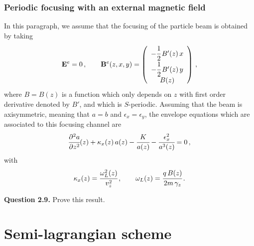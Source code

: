 \documentclass[10pt]{article}
\newcommand{\D}{{\partial}}
\begin{document}
\subsubsection{Periodic focusing with an external magnetic field}

In this paragraph, we assume that the focusing of the particle beam is obtained by taking
\begin{equation} \label{periodic_magnetic}
\mathbf{E}^{e} = 0 \, , \qquad \mathbf{B}^{e}(z,x,y) = \left(
\begin{array}{c}
-\cfrac{1}{2}\,B'(z)\,x \\
-\cfrac{1}{2}\,B'(z)\,y \\
B(z)
\end{array}
\right) \, ,
\end{equation}
where $B = B(z)$ is a function which only depends on $z$ with first order derivative denoted by $B'$, and which is $S$-periodic. Assuming that the beam is axisymmetric, meaning that $a = b$ and $\epsilon_{x} = \epsilon_{y}$, the envelope equations which are associated to this focusing channel are
\begin{equation}
\cfrac{\D^{2}a}{\D z^{2}}(z) + \kappa_{x}(z) \, a(z) - \cfrac{K}{a(z)} - \cfrac{\epsilon_{x}^{2}}{a^{3}(z)} = 0 \, ,
\end{equation}
with
\begin{equation}
\kappa_{x}(z) = \cfrac{\omega_{L}^{2}(z)}{v_{z}^{2}} \, , \qquad \omega_{L}(z) = \cfrac{q\,B(z)}{2m\,\gamma_{z}} \, .
\end{equation}

\begin{leftbar}
\textbf{Question 2.9.\footnotemark[2]} Prove this result.
\end{leftbar}






\section{Semi-lagrangian scheme}
\setcounter{equation}{0}
\end{document}
